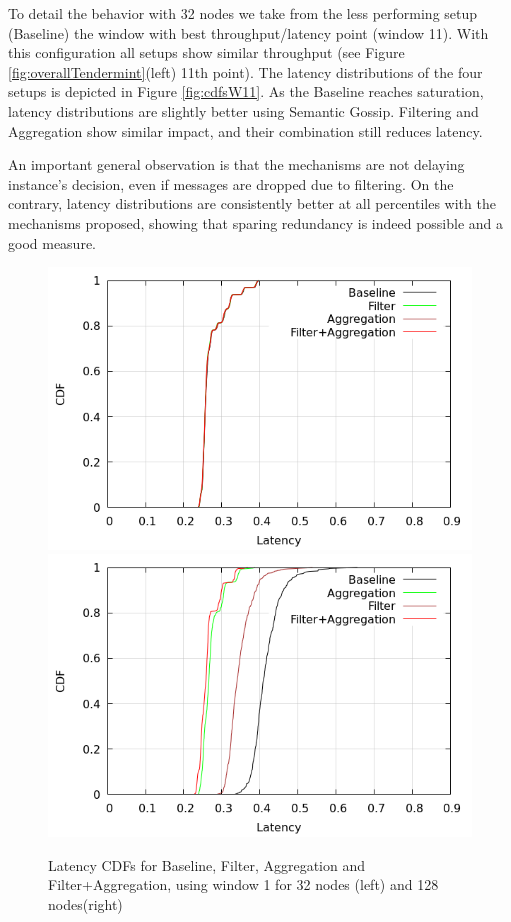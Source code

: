 To detail the behavior with 32 nodes we take from the less performing setup (Baseline) the window with best throughput/latency point (window 11).  With this configuration all setups show similar throughput (see Figure \ref{fig:overallTendermint}(left) 11th point).
The latency distributions of the four setups is depicted in Figure \ref{fig:cdfsW11}.  As the Baseline reaches saturation, latency distributions are slightly better using Semantic Gossip.  Filtering and Aggregation show similar impact, and their combination still reduces latency.      

An important general observation is that the mechanisms are not delaying instance's decision, even if messages are dropped due to filtering.  On the contrary, latency distributions are consistently better at all percentiles with the mechanisms proposed, showing that sparing redundancy is indeed possible and a good measure.


\begin{figure}[htbp]
\centering
\includegraphics[width=\columnwidth]{figures/w1-32nodes-cdf.png}
\includegraphics[width=\columnwidth]{figures/128nodes-cdf.png}
\caption{Latency CDFs for Baseline, Filter, Aggregation and Filter+Aggregation, using window 1 for 32 nodes (left) and  128 nodes(right)}
\label{fig:cdfs}
\end{figure}

